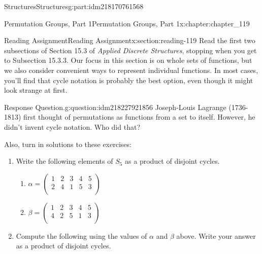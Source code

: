 \documentclass[oneside,10pt,]{book}
\numberwithin{equation}{section}
\begin{document}
\begin{partptx}{Structures}{}{Structures}{}{}{g:part:idm218170761568}
%
\typeout{************************************************}
\typeout{************************************************}
%
\begin{chapterptx}{Permutation Groups, Part 1}{}{Permutation Groups, Part 1}{}{}{x:chapter:chapter_119}
\index{}%
%
%
\typeout{************************************************}
\typeout{************************************************}
%
\begin{sectionptx}{Reading Assignment}{}{Reading Assignment}{}{}{x:section:reading-119}
Read the first two subsections of Section 15.3 of \emph{Applied Discrete Structures}, stopping when you get to  Subsection 15.3.3. Our focus in this section is on whole sets of functions, but we also consider convenient ways to represent individual functions.  In most cases, you'll find that cycle notation is probably the best option, even though it might look strange at first.%
\begin{question}{Response Question.}{g:question:idm218227921856}%
Joseph-Louis Lagrange (1736-1813) first thought of permutations as functions from a set to itself. However, he didn't invent cycle notation.  Who did that?%
\end{question}
Also, turn in solutions to these exercises:%
\begin{enumerate}[label=\arabic*]
\item{}Write the following elements of \(S_5\) as a product of disjoint cycles.%
\begin{multicols}{2}
\begin{enumerate}[label=(\alph*)]
\item{}\(\displaystyle \alpha=\left(
\begin{array}{ccccc}
1 & 2 & 3 & 4 & 5 \\
2 & 4 & 1 & 5 & 3 \\
\end{array}
\right)\)%
\item{}\(\displaystyle \beta=\left(
\begin{array}{ccccc}
1 & 2 & 3 & 4 & 5 \\
4 & 2 & 5 & 1 & 3 \\
\end{array}
\right)\)%
\end{enumerate}
\end{multicols}
%
\item{}Compute the following using the values of \(\alpha\) and \(\beta\) above.  Write your answer as a product of disjoint cycles.%

\end{enumerate}
\end{sectionptx}
\end{chapterptx}
\end{partptx}
\end{document}
